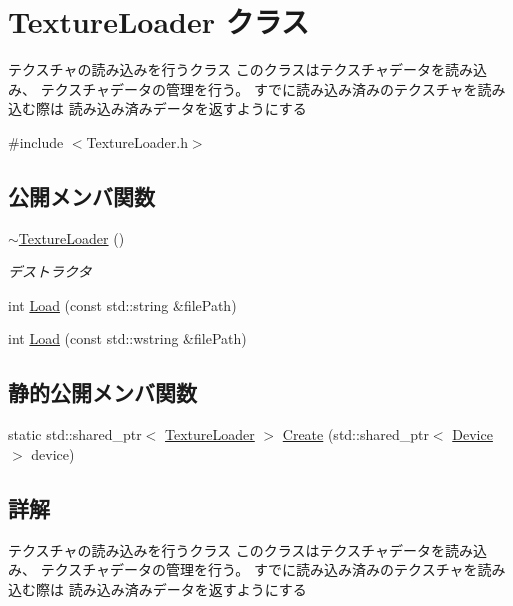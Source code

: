 \hypertarget{class_texture_loader}{}\section{Texture\+Loader クラス}
\label{class_texture_loader}


テクスチャの読み込みを行うクラス このクラスはテクスチャデータを読み込み、 テクスチャデータの管理を行う。 すでに読み込み済みのテクスチャを読み込む際は 読み込み済みデータを返すようにする  




{\ttfamily \#include $<$Texture\+Loader.\+h$>$}

\subsection*{公開メンバ関数}
\begin{DoxyCompactItemize}
\item 
\mbox{\hyperlink{class_texture_loader_aee3a49f73e5f88890658b17e9896c4f2}{$\sim$\+Texture\+Loader}} ()
\begin{DoxyCompactList}\small\item\em デストラクタ \end{DoxyCompactList}\item 
int \mbox{\hyperlink{class_texture_loader_a9aefce2fb588949ce0103ea35a046dda}{Load}} (const std\+::string \&file\+Path)
\item 
int \mbox{\hyperlink{class_texture_loader_abf45a1267dfcc7703a7f99ba7069d571}{Load}} (const std\+::wstring \&file\+Path)
\end{DoxyCompactItemize}
\subsection*{静的公開メンバ関数}
\begin{DoxyCompactItemize}
\item 
static std\+::shared\+\_\+ptr$<$ \mbox{\hyperlink{class_texture_loader}{Texture\+Loader}} $>$ \mbox{\hyperlink{class_texture_loader_a60cad37b407b057692af03224c60bc18}{Create}} (std\+::shared\+\_\+ptr$<$ \mbox{\hyperlink{class_device}{Device}} $>$ device)
\end{DoxyCompactItemize}


\subsection{詳解}
テクスチャの読み込みを行うクラス このクラスはテクスチャデータを読み込み、 テクスチャデータの管理を行う。 すでに読み込み済みのテクスチャを読み込む際は 読み込み済みデータを返すようにする 

